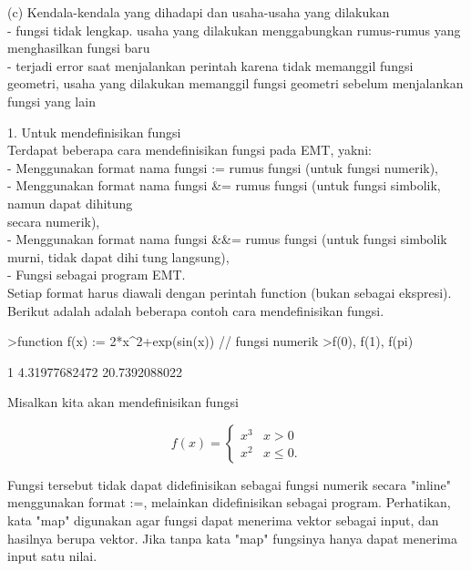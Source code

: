 \documentclass[a4paper,10pt]{article}
\begin{document}
\begin{eulernotebook}
\begin{eulercomment}
\begin{eulercomment}
\begin{eulercomment}
(c) Kendala-kendala yang dihadapi dan usaha-usaha yang dilakukan\\
- fungsi tidak lengkap. usaha yang dilakukan menggabungkan rumus-rumus
yang menghasilkan fungsi baru\\
- terjadi error saat menjalankan perintah karena tidak memanggil
fungsi geometri, usaha yang dilakukan memanggil fungsi geometri
sebelum menjalankan fungsi yang lain
\end{eulercomment}
\eulersubheading{}
\eulersubheading{}
\begin{eulercomment}
1. Untuk mendefinisikan fungsi\\
Terdapat beberapa cara mendefinisikan fungsi pada EMT, yakni:\\
- Menggunakan format nama fungsi := rumus fungsi (untuk fungsi numerik),\\
- Menggunakan format nama fungsi \&= rumus fungsi (untuk fungsi simbolik, namun dapat dihitung\\
secara numerik),\\
- Menggunakan format nama fungsi \&\&= rumus fungsi (untuk fungsi simbolik murni, tidak dapat
dihitung langsung),\\
- Fungsi sebagai program EMT.\\
Setiap format harus diawali dengan perintah function (bukan sebagai ekspresi).\\
Berikut adalah adalah beberapa contoh cara mendefinisikan fungsi.
\end{eulercomment}
\begin{eulerprompt}
>function f(x) := 2*x^2+exp(sin(x)) // fungsi numerik
>f(0), f(1), f(pi)
\end{eulerprompt}
\begin{euleroutput}
  1
  4.31977682472
  20.7392088022
\end{euleroutput}
\begin{eulercomment}
Misalkan kita akan mendefinisikan fungsi

\end{eulercomment}
\begin{eulerformula}
\[
f(x) = \begin{cases} x^3 & x>0 \\ x^2 & x\le 0. \end{cases}
\]
\end{eulerformula}
\begin{eulercomment}
Fungsi tersebut tidak dapat didefinisikan sebagai fungsi numerik
secara "inline" menggunakan format :=, melainkan didefinisikan sebagai
program. Perhatikan, kata "map" digunakan agar fungsi dapat menerima
vektor sebagai input, dan hasilnya berupa vektor. Jika tanpa kata
"map" fungsinya hanya dapat menerima input satu nilai.


\end{eulercomment}
\end{eulercomment}
\end{eulercomment}
\end{eulernotebook}
\end{document}
